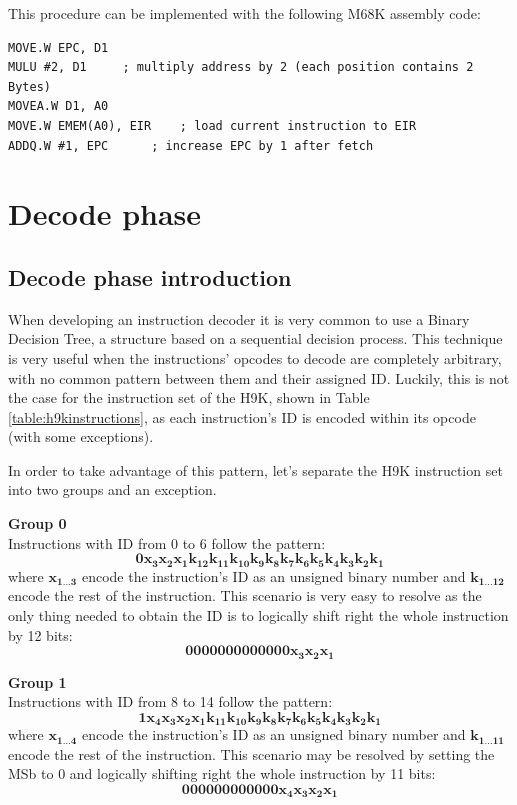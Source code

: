 \documentclass[11pt, a4paper]{article}
\begin{document}
This procedure can be implemented with the following M68K assembly code:
\begin{lstlisting}[style=customasm, caption={HAL9000 emulator fetch phase code}, label={code:fetchcode}]
MOVE.W EPC, D1
MULU #2, D1		; multiply address by 2 (each position contains 2 Bytes)
MOVEA.W D1, A0
MOVE.W EMEM(A0), EIR	; load current instruction to EIR
ADDQ.W #1, EPC		; increase EPC by 1 after fetch
\end{lstlisting}

\section{Decode phase}
\subsection{Decode phase introduction}
When developing an instruction decoder it is very common to use a Binary Decision Tree, a structure
based on a sequential decision process. This technique is very useful when the instructions'
opcodes to decode are completely arbitrary, with no common pattern between them and their assigned
ID. Luckily, this is not the case for the instruction set of the H9K, shown in Table
\ref{table:h9kinstructions}, as each instruction's ID is encoded within its opcode (with some
exceptions).

In order to take advantage of this pattern, let's separate the H9K instruction set into two groups and
an exception.

\noindent\textbf{Group 0} \\
Instructions with ID from 0 to 6 follow the pattern:
\begin{equation*}
	\mathbf{0x_3x_2x_1k_{12}k_{11}k_{10}k_9k_8k_7k_6k_5k_4k_3k_2k_1}
\end{equation*}
where $\mathbf{x_{1 \ldots 3}}$ encode the instruction's ID as an unsigned binary number and
$\mathbf{k_{1 \ldots 12}}$ encode the rest of the instruction. This scenario is very easy to resolve
as the only thing needed to obtain the ID is to logically shift right the whole instruction by 12
bits:
\begin{equation*}
	\mathbf{0000000000000x_3x_2x_1}
\end{equation*}

\noindent\textbf{Group 1} \\
Instructions with ID from 8 to 14 follow the pattern:
\begin{equation*}
	\mathbf{1x_4x_3x_2x_1k_{11}k_{10}k_9k_8k_7k_6k_5k_4k_3k_2k_1}
\end{equation*}
where $\mathbf{x_{1 \ldots 4}}$ encode the instruction's ID as an unsigned binary number and
$\mathbf{k_{1 \ldots 11}}$ encode the rest of the instruction. This scenario may be resolved by
setting the MSb to 0 and logically shifting right the whole instruction by 11 bits:
\begin{equation*}
	\mathbf{000000000000x_4x_3x_2x_1}
\end{equation*}
\end{document}

